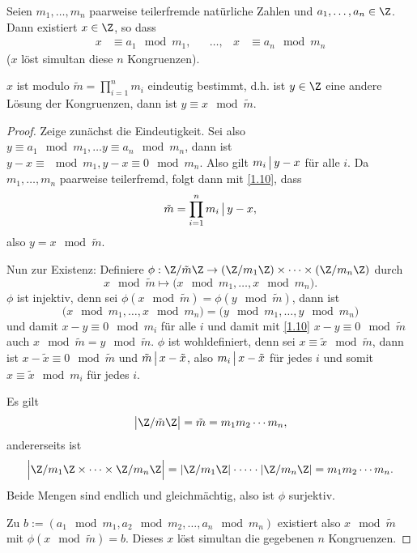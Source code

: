 \begin{st} \label{1.13}
	Seien $m_1, \dotsc, m_n$ paarweise teilerfremde natürliche Zahlen und $a_1, \dotsc, a_n \in \Z$.
	Dann existiert $x \in \Z$, so dass
	\begin{align*}
		x &\equiv a_1 \mod m_1,&
		&\dotsc,&
		x &\equiv a_n \mod m_n
	\end{align*}
	($x$ löst simultan diese $n$ Kongruenzen).

	$x$ ist modulo $\tilde m = \prod_{i=1}^n m_i$ eindeutig bestimmt, d.h. ist $y \in \Z$ eine andere Lösung der Kongruenzen, dann ist $y \equiv x \mod \tilde m$.
	\begin{proof}
		Zeige zunächst die Eindeutigkeit.
		Sei also $y \equiv a_1 \mod m_1, \dotsc y \equiv a_n \mod m_n$, dann ist $y -x \equiv \mod m_1, y-x \equiv 0 \mod m_n$.
		Also gilt $m_i \divs y-x$ für alle $i$.
		Da $m_1, \dotsc, m_n$ paarweise teilerfremd, folgt dann mit \ref{1.10}, dass
		\[
			\tilde m = \prod_{i=1}^n m_i \divs y - x,
		\]
		also $y = x \mod \tilde m$.

		Nun zur Existenz:
		Definiere $\phi: \Z / \tilde m \Z \to (\Z / m_1 \Z) \times \dotsb \times (\Z / m_n \Z)$ durch
		\[
			x \mod \tilde m
			\mapsto
			\big( x \mod m_1, \dotsc, x \mod m_n \big).
		\]
		$\phi$ ist injektiv, denn sei $\phi(x \mod \tilde m) = \phi(y \mod \tilde m)$, dann ist
		\[
			\big( x \mod m_1, \dotsc, x \mod m_n \big)
			= \big( y \mod m_1, \dotsc, y \mod m_n \big)
		\]
		und damit $x - y \equiv 0 \mod m_i$ für alle $i$ und damit mit \ref{1.10} $x - y \equiv 0 \mod \tilde m$ auch $x \mod \tilde m = y \mod \tilde m$.
		$\phi$ ist wohldefiniert, denn sei $x \equiv \tilde x \mod \tilde m$, dann ist $x - \tilde x \equiv 0 \mod \tilde m$ und $\tilde m \divs x - \tilde x$, also $m_i \divs x - \tilde x$ für jedes $i$ und somit $x \equiv \tilde x \mod m_i$ für jedes $i$.

		Es gilt
		\[
			\big| \Z / \tilde m \Z \big|
			= \tilde m
			= m_1 m_2 \dotsb m_n,
		\]
		andererseits ist
		\[
			\Big| \Z/ m_1 \Z \times \dotsb \times \Z / m_n \Z \Big|
			= | \Z / m_1 \Z | \cdot \dotsb \cdot | \Z / m_n \Z|
			= m_1 m_2 \dotsb m_n.
		\]
		Beide Mengen sind endlich und gleichmächtig, also ist $\phi$ surjektiv.

		Zu $b := (a_1 \mod m_1, a_2 \mod m_2, \dotsc, a_n \mod m_n)$ existiert also $x \mod \tilde m$ mit $\phi(x \mod \tilde m) = b$.
		Dieses $x$ löst simultan die gegebenen $n$ Kongruenzen.
	\end{proof}
\end{st}

